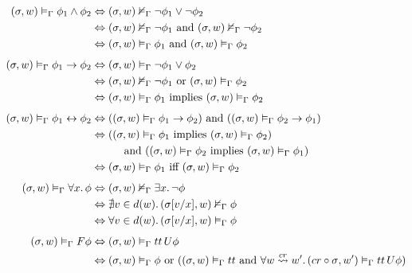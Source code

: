 \begin{align}
  \sem{\sigma}{w}{\Gamma}{\phi_1 \land \phi_2}
    &\Leftrightarrow \semn{\sigma}{w}{\Gamma}{\neg\phi_1 \lor \neg\phi_2} \notag \\
    &\Leftrightarrow \semn{\sigma}{w}{\Gamma}{\neg\phi_1} \text{ and } \semn{\sigma}{w}{\Gamma}{\neg\phi_2} \notag \\
    &\Leftrightarrow \sem{\sigma}{w}{\Gamma}{\phi_1} \text{ and } \sem{\sigma}{w}{\Gamma}{\phi_2} \label{eq:andsem} \\[1ex]
  \sem{\sigma}{w}{\Gamma}{\phi_1 \to \phi_2}
    &\Leftrightarrow \sem{\sigma}{w}{\Gamma}{\neg\phi_1 \lor \phi_2} \notag \\
    &\Leftrightarrow \semn{\sigma}{w}{\Gamma}{\neg\phi_1} \text{ or } \sem{\sigma}{w}{\Gamma}{\phi_2} \notag \\
    &\Leftrightarrow \sem{\sigma}{w}{\Gamma}{\phi_1} \text{ implies } \sem{\sigma}{w}{\Gamma}{\phi_2} \label{eq:impliessem} \\[1ex]
  \sem{\sigma}{w}{\Gamma}{\phi_1 \leftrightarrow \phi_2}
    &\Leftrightarrow (\sem{\sigma}{w}{\Gamma}{\phi_1 \to \phi_2}) \text{ and } (\sem{\sigma}{w}{\Gamma}{\phi_2 \to \phi_1}) \notag \\
    &\Leftrightarrow (\sem{\sigma}{w}{\Gamma}{\phi_1} \text{ implies } \sem{\sigma}{w}{\Gamma}{\phi_2}) \notag \\
        &\qquad\quad\text{and } (\sem{\sigma}{w}{\Gamma}{\phi_2} \text{ implies } \sem{\sigma}{w}{\Gamma}{\phi_1}) \notag \\
    &\Leftrightarrow \sem{\sigma}{w}{\Gamma}{\phi_1} \text{ iff } \sem{\sigma}{w}{\Gamma}{\phi_2} \label{eq:iffsem} \\[1ex]
  \sem{\sigma}{w}{\Gamma}{\foralls{x}{\phi}}
    &\Leftrightarrow \semn{\sigma}{w}{\Gamma}{\existss{x}{\neg\phi}} \notag \\
    &\Leftrightarrow \nexists v \in d(w) \ldotp \semn{\sigma[v/x]}{w}{\Gamma}{\phi} \notag \\
    &\Leftrightarrow \foralls{v \in d(w)}{\sem{\sigma[v/x]}{w}{\Gamma}{\phi}} \label{eq:forallsem} \\[1ex]
  \sem{\sigma}{w}{\Gamma}{\eventually{\phi}}
    &\Leftrightarrow \sem{\sigma}{w}{\Gamma}{\until{tt}{\phi}} \notag \\
    &\Leftrightarrow \sem{\sigma}{w}{\Gamma}{\phi} \text{ or }
        (\sem{\sigma}{w}{\Gamma}{tt} \text { and } \foralls{\worldcr{w}{cr}{w'}}{\sem{cr \circ \sigma}{w'}{\Gamma}{\until{tt}{\phi}}}) \notag \\

\end{align}
